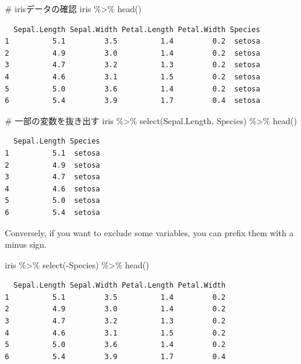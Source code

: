 \documentclass[
  a4paper,
]{book}
\newenvironment{Shaded}{\begin{snugshade}}{\end{snugshade}}
\newcommand{\CommentTok}[1]{\textcolor[rgb]{0.37,0.37,0.37}{#1}}
\newcommand{\FunctionTok}[1]{\textcolor[rgb]{0.28,0.35,0.67}{#1}}
\newcommand{\NormalTok}[1]{\textcolor[rgb]{0.00,0.23,0.31}{#1}}
\newcommand{\SpecialCharTok}[1]{\textcolor[rgb]{0.37,0.37,0.37}{#1}}
\begin{document}
\begin{Shaded}
\begin{Highlighting}[]
\CommentTok{\# irisデータの確認}
\NormalTok{iris }\SpecialCharTok{\%\textgreater{}\%} \FunctionTok{head}\NormalTok{()}
\end{Highlighting}
\end{Shaded}

\begin{verbatim}
  Sepal.Length Sepal.Width Petal.Length Petal.Width Species
1          5.1         3.5          1.4         0.2  setosa
2          4.9         3.0          1.4         0.2  setosa
3          4.7         3.2          1.3         0.2  setosa
4          4.6         3.1          1.5         0.2  setosa
5          5.0         3.6          1.4         0.2  setosa
6          5.4         3.9          1.7         0.4  setosa
\end{verbatim}

\begin{Shaded}
\begin{Highlighting}[]
\CommentTok{\# 一部の変数を抜き出す}
\NormalTok{iris }\SpecialCharTok{\%\textgreater{}\%}
  \FunctionTok{select}\NormalTok{(Sepal.Length, Species) }\SpecialCharTok{\%\textgreater{}\%}
  \FunctionTok{head}\NormalTok{()}
\end{Highlighting}
\end{Shaded}

\begin{verbatim}
  Sepal.Length Species
1          5.1  setosa
2          4.9  setosa
3          4.7  setosa
4          4.6  setosa
5          5.0  setosa
6          5.4  setosa
\end{verbatim}

Conversely, if you want to exclude some variables, you can prefix them
with a minus sign.

\begin{Shaded}
\begin{Highlighting}[]
\NormalTok{iris }\SpecialCharTok{\%\textgreater{}\%}
  \FunctionTok{select}\NormalTok{(}\SpecialCharTok{{-}}\NormalTok{Species) }\SpecialCharTok{\%\textgreater{}\%}
  \FunctionTok{head}\NormalTok{()}
\end{Highlighting}
\end{Shaded}

\begin{verbatim}
  Sepal.Length Sepal.Width Petal.Length Petal.Width
1          5.1         3.5          1.4         0.2
2          4.9         3.0          1.4         0.2
3          4.7         3.2          1.3         0.2
4          4.6         3.1          1.5         0.2
5          5.0         3.6          1.4         0.2
6          5.4         3.9          1.7         0.4
\end{verbatim}
\end{document}

